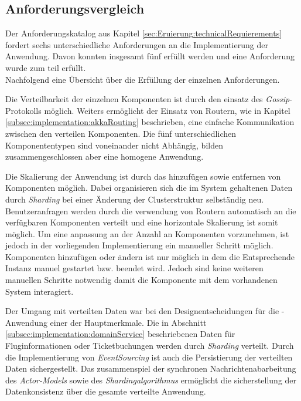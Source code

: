\subsection{Anforderungsvergleich}
Der Anforderungskatalog aus Kapitel \ref{sec:Eruierung:technicalRequierements} fordert sechs unterschiedliche Anforderungen an die Implementierung der Anwendung. Davon konnten insgesamt fünf erfüllt werden und eine Anforderung wurde zum teil erfüllt. \\
Nachfolgend eine Übersicht über die Erfüllung der einzelnen Anforderungen.
\begin{enumerate}
    Die Verteilbarkeit der einzelnen Komponenten ist durch den einsatz des \textit{Gossip}-Protokolls möglich. Weiters ermöglicht der Einsatz von Routern, wie in Kapitel \ref{subsec:implementation:akkaRouting} beschrieben, eine einfache Kommunikation  zwischen den verteilen Komponenten. Die fünf unterschiedlichen Komponententypen sind voneinander nicht Abhängig, bilden zusammengeschlossen aber eine homogene Anwendung.

    Die Skalierung der Anwendung ist durch das hinzufügen sowie entfernen von Komponenten möglich. Dabei organisieren sich die im System gehaltenen Daten durch \textit{Sharding} bei einer Änderung der Clusterstruktur selbständig neu. Benutzeranfragen werden durch die verwendung von Routern automatisch an die verfügbaren Komponenten verteilt und eine horizontale Skalierung ist somit möglich. Um eine anpassung an der Anzahl an Komponenten vorzunehmen, ist jedoch in der vorliegenden Implementierung ein manueller Schritt möglich. Komponenten hinzufügen oder ändern ist nur möglich in dem die Entsprechende Instanz manuel gestartet bzw. beendet wird. Jedoch sind keine weiteren manuellen Schritte notwendig damit die Komponente mit dem vorhandenen System interagiert. 

    Der Umgang mit verteilten Daten war bei den Designentscheidungen für die -Anwendung einer der Hauptmerkmale. Die in Abschnitt \ref{subsec:implementation:domainService} beschriebenen Daten für Fluginformationen oder Ticketbuchungen werden durch \textit{Sharding} verteilt. Durch die Implementierung von \textit{EventSourcing} ist auch die Persistierung der verteilten Daten sichergestellt. Das zusammenspiel der synchronen Nachrichtenabarbeitung des \textit{Actor-Models} sowie des \textit{Shardingalgorithmus} ermöglicht die sicherstellung der Datenkonsistenz über die gesamte verteilte Anwendung.
   

\end{enumerate}
